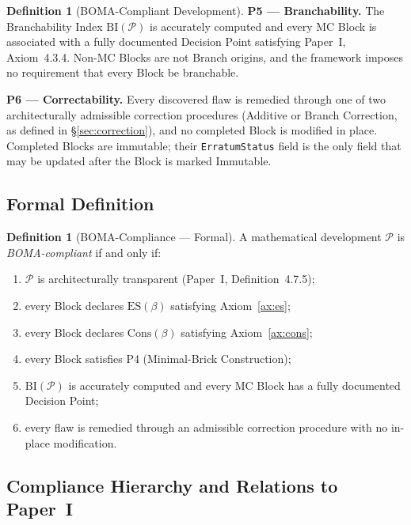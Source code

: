 \documentclass[12pt, a4paper]{article}
\theoremstyle{plain}
\theoremstyle{definition}
\newtheorem{definition}[theorem]{Definition}
\theoremstyle{remark}
\newcommand{\BOMA}{\textsf{BOMA}}
\newcommand{\ES}[1]{\mathrm{ES}(#1)}
\newcommand{\Cons}[1]{\mathrm{Cons}(#1)}
\newcommand{\BI}[1]{\mathrm{BI}(#1)}
\newcommand{\MC}{\mathrm{MC}}
\begin{document}
\begin{definition}[\BOMA{}-Compliant Development]
\medskip
\noindent\textbf{P5 --- Branchability.}
The Branchability Index $\BI{\mathcal{P}}$ is accurately computed
and every $\MC$ Block is associated with a fully documented Decision
Point satisfying Paper~I, Axiom~4.3.4. Non-$\MC$ Blocks are not
Branch origins, and the framework imposes no requirement that every
Block be branchable.

\medskip
\noindent\textbf{P6 --- Correctability.}
Every discovered flaw is remedied through one of two architecturally
admissible correction procedures (Additive or Branch Correction, as
defined in \S\ref{sec:correction}), and no completed Block is
modified in place. Completed Blocks are immutable; their
\texttt{ErratumStatus} field is the only field that may be updated
after the Block is marked Immutable.
\end{definition}

\subsection{Formal Definition}
\label{subsec:formal}

\begin{definition}[\BOMA{}-Compliance --- Formal]
\label{def:formal-compliant}
A mathematical development $\mathcal{P}$ is \emph{\BOMA{}-compliant}
if and only if:
\begin{enumerate}
  \item $\mathcal{P}$ is architecturally transparent (Paper~I,
        Definition~4.7.5);
  \item every Block declares $\ES{\beta}$ satisfying
        Axiom~\ref{ax:es};
  \item every Block declares $\Cons{\beta}$ satisfying
        Axiom~\ref{ax:cons};
  \item every Block satisfies P4 (Minimal-Brick Construction);
  \item $\BI{\mathcal{P}}$ is accurately computed and every $\MC$
        Block has a fully documented Decision Point;
  \item every flaw is remedied through an admissible correction
        procedure with no in-place modification.
\end{enumerate}
\end{definition}

\subsection{Compliance Hierarchy and Relations to Paper~I}
\label{subsec:hierarchy}
\end{document}
